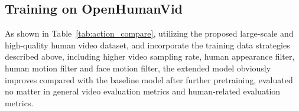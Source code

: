 \subsection{Training on OpenHumanVid} 
As shown in Table~\ref{tab:action_compare}, utilizing the proposed large-scale and high-quality human video dataset, and incorporate the training data strategies described above, including higher video sampling rate, human appearance filter, human motion filter and face motion filter, the extended model obviously improves compared with the baseline model after further pretraining, evaluated no matter in general video evaluation metrics and human-related evaluation metrics.

\vspace{-2mm}

